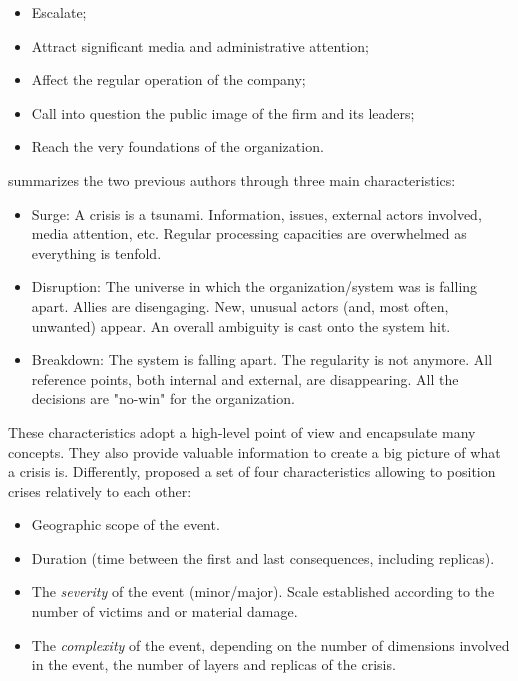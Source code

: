 \begin{itemize}
    \item Escalate;
    \item Attract significant media and administrative attention;
    \item Affect the regular operation of the company;
    \item Call into question the public image of the firm and its leaders;
    \item Reach the very foundations of the organization.
\end{itemize}

\textcite{lagadecGESTIONCRISES1994} summarizes the two previous authors through three main characteristics:

\begin{itemize}
    \item Surge: A crisis is a tsunami. Information, issues, external actors involved, media attention, etc.
          Regular processing capacities are overwhelmed as everything is tenfold.
    \item Disruption: The universe in which the organization/system was is falling apart. Allies are disengaging. New, unusual actors (and, most often, unwanted) appear.
          An overall ambiguity is cast onto the system hit.
    \item Breakdown: The system is falling apart. The regularity is not anymore. All reference points, both internal and external, are disappearing.
          All the decisions are "no-win" for the organization.
\end{itemize}

These characteristics adopt a high-level point of view and encapsulate many concepts.
They also provide valuable information to create a big picture of what a crisis is.
Differently, \textcite{fertierInterpretationAutomatiqueDonnees2018} proposed a set of four characteristics allowing to position crises relatively to each other:

\begin{itemize}
    \item Geographic scope of the event.
    \item Duration (time between the first and last consequences, including replicas).
    \item The \emph{severity} of the event (minor/major). Scale established according to the number of victims and or material damage.
    \item The \emph{complexity} of the event, depending on the number of dimensions involved in the event, the number of layers and replicas of the crisis.
\end{itemize}

